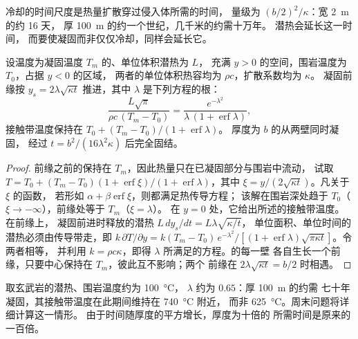冷却的时间尺度是热量扩散穿过侵入体所需的时间，
量级为 $(b/2)^2/\kappa$：宽 \qty{2}{m} 的约 \num{16} 天，
厚 \qty{100}{m} 的约一个世纪，几千米的约需十万年。
潜热会延长这一时间，
而要使凝固而非仅仅冷却，同样会延长它。

\begin{proposition}[侵入体的凝固]\label{prop:b2:magma-emplacement:stefan}
设温度为凝固温度 $T_m$ 的、单位体积潜热为 $L$，
充满 $y > 0$ 的空间，围岩温度为 $T_0$，占据 $y < 0$ 的区域，
两者的单位体积热容均为 $\rho c$，扩散系数均为 $\kappa$。
凝固前缘按 $y_s = 2\lambda\sqrt{\kappa t}$ 推进，其中 $\lambda$
是下列方程的根：
\[
\frac{L\sqrt\pi}{\rho c\,(T_m - T_0)} = \frac{e^{-\lambda^2}}{\lambda\,(1 + \operatorname{erf}\lambda)},
\]
接触带温度保持在 $T_0 + (T_m - T_0)/(1 + \operatorname{erf}\lambda)$。
厚度为 $b$ 的从两壁同时凝固，
经过 $t = b^2/(16\lambda^2\kappa)$ 后完全固结。
\end{proposition}

\begin{proof}
前缘之前的保持在 $T_m$，因此热量只在已凝固部分与围岩中流动，
试取 $T = T_0 + (T_m - T_0)(1 + \operatorname{erf}\xi)/(1 +
\operatorname{erf}\lambda)$，其中 $\xi = y/(2\sqrt{\kappa t})$。凡关于 $\xi$ 的函数，
若形如 $\alpha + \beta\operatorname{erf}\xi$，则都满足热传导方程；
该解在围岩深处趋于 $T_0$（$\xi \to -\infty$），前缘处等于 $T_m$（$\xi = \lambda$）。
在 $y = 0$ 处，它给出所述的接触带温度。在前缘上，
凝固前进时释放的潜热 $L\,dy_s/dt = L\lambda\sqrt{\kappa/t}$，
单位面积、单位时间的潜热必须由传导带走，即 $k\,\partial T/\partial y = k(T_m -
T_0)\,e^{-\lambda^2}/[(1 + \operatorname{erf}\lambda)\sqrt{\pi\kappa t}]$。令两者相等，
并利用 $k = \rho c\kappa$，即得 $\lambda$ 所满足的方程。的每一壁
各自生长一个前缘，只要中心保持在 $T_m$，彼此互不影响；两个
前缘在 $2\lambda\sqrt{\kappa t} = b/2$ 时相遇。
\end{proof}

取玄武岩的潜热、围岩温度约为 \qty{100}{\celsius}，
$\lambda$ 约为 $0.65$：厚 \qty{100}{m} 的约需
七十年凝固，其接触带温度在此期间维持在 \qty{740}{\celsius} 附近，
而非 \qty{625}{\celsius}。周末问题将详细计算这一情形。
由于时间随厚度的平方增长，厚度为十倍的
所需时间是原来的一百倍。

